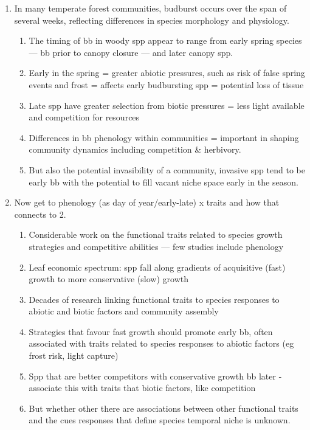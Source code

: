\documentclass{article}
\begin{document}
\begin{enumerate}
\item In many temperate forest communities, budburst occurs over the span of several weeks, reflecting differences in species morphology and physiology.
\begin{enumerate}
\item The timing of bb in woody spp appear to range from early spring species — bb prior to canopy closure — and later canopy spp. 
\item Early in the spring = greater abiotic pressures, such as risk of false spring events and frost = affects early budbursting spp = potential loss of tissue
\item Late spp have greater selection from biotic pressures = less light available and competition for resources 
\item Differences in bb phenology within communities = important in shaping community dynamics including competition \& herbivory. 
\item But also the potential invasibility of a community, invasive spp tend to be early bb with the potential to fill vacant niche space early in the season. 
\end{enumerate}

\item Now get to phenology (as day of year/early-late) x traits and how that connects to 2. %
\begin{enumerate}
\item Considerable work on the functional traits related to species growth strategies and competitive abilities — few studies include phenology
\item Leaf economic spectrum: spp fall along gradients of acquisitive (fast) growth to more conservative (slow) growth %
\item Decades of research linking functional traits to species responses to abiotic and biotic factors and community assembly
\item Strategies that favour fast growth should promote early bb, often associated with traits related to species responses to abiotic factors (eg frost risk, light capture)
\item Spp that are better competitors with conservative growth bb later - associate this with traits that biotic factors, like competition
\item But whether other there are associations between other functional traits and the cues responses that define species temporal niche is unknown.
\end{enumerate}


\end{enumerate}
\end{document}
